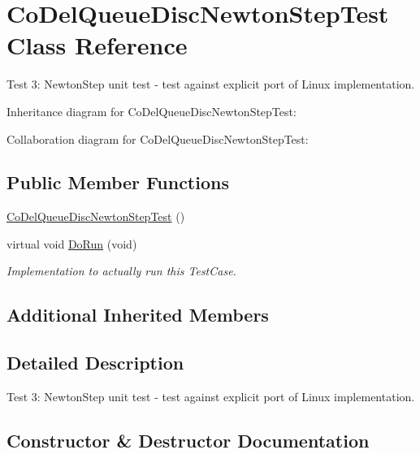 \hypertarget{classCoDelQueueDiscNewtonStepTest}{}\section{Co\+Del\+Queue\+Disc\+Newton\+Step\+Test Class Reference}
\label{classCoDelQueueDiscNewtonStepTest}


Test 3\+: Newton\+Step unit test -\/ test against explicit port of Linux implementation.  




Inheritance diagram for Co\+Del\+Queue\+Disc\+Newton\+Step\+Test\+:


Collaboration diagram for Co\+Del\+Queue\+Disc\+Newton\+Step\+Test\+:
\subsection*{Public Member Functions}
\begin{DoxyCompactItemize}
\item 
\hyperlink{classCoDelQueueDiscNewtonStepTest_aa652101a80893994d7b1186f8adcb306}{Co\+Del\+Queue\+Disc\+Newton\+Step\+Test} ()
\item 
virtual void \hyperlink{classCoDelQueueDiscNewtonStepTest_a9c0c31481838de1692b31a59b24026b3}{Do\+Run} (void)
\begin{DoxyCompactList}\small\item\em Implementation to actually run this Test\+Case. \end{DoxyCompactList}\end{DoxyCompactItemize}
\subsection*{Additional Inherited Members}


\subsection{Detailed Description}
Test 3\+: Newton\+Step unit test -\/ test against explicit port of Linux implementation. 

\subsection{Constructor \& Destructor Documentation}
